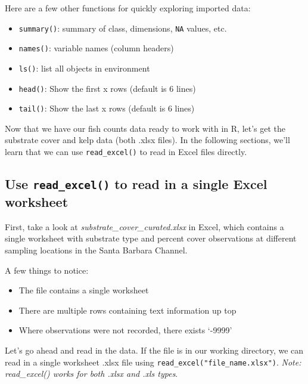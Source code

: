 \documentclass[]{book}
\providecommand{\tightlist}{%
  \setlength{\itemsep}{0pt}\setlength{\parskip}{0pt}}
\begin{document}
Here are a few other functions for quickly exploring imported data:

\begin{itemize}
\tightlist
\item
  \texttt{summary()}: summary of class, dimensions, \texttt{NA} values, etc.
\item
  \texttt{names()}: variable names (column headers)
\item
  \texttt{ls()}: list all objects in environment
\item
  \texttt{head()}: Show the first x rows (default is 6 lines)
\item
  \texttt{tail()}: Show the last x rows (default is 6 lines)
\end{itemize}

Now that we have our fish counts data ready to work with in R, let's get the substrate cover and kelp data (both .xlsx files). In the following sections, we'll learn that we can use \texttt{read\_excel()} to read in Excel files directly.

\hypertarget{use-read_excel-to-read-in-a-single-excel-worksheet}{%
\subsection{\texorpdfstring{Use \texttt{read\_excel()} to read in a single Excel worksheet}{Use read\_excel() to read in a single Excel worksheet}}\label{use-read_excel-to-read-in-a-single-excel-worksheet}}

First, take a look at \emph{substrate\_cover\_curated.xlsx} in Excel, which contains a single worksheet with substrate type and percent cover observations at different sampling locations in the Santa Barbara Channel.

A few things to notice:

\begin{itemize}
\tightlist
\item
  The file contains a single worksheet
\item
  There are multiple rows containing text information up top
\item
  Where observations were not recorded, there exists `-9999'
\end{itemize}

Let's go ahead and read in the data. If the file is in our working directory, we can read in a single worksheet .xlsx file using \texttt{read\_excel("file\_name.xlsx")}. \emph{Note: read\_excel() works for both .xlsx and .xls types}.
\end{document}
